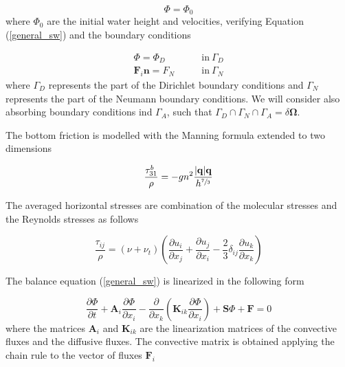 \documentclass[a4paper,12pt]{article}
\newcommand{\pder}[2]{\frac{\partial#1}{\partial#2}}
\newcommand{\abs}[1]{\lvert#1\rvert}
\begin{document}
\begin{equation}
\Phi = \Phi_0
\end{equation}
where $\Phi_0$ are the initial water height and velocities, verifying Equation (\ref{general_sw}) and the boundary conditions

\begin{align}
\Phi = \Phi_D \qquad &\text{in} \ \Gamma_D \\
\mathbf{F}_i\mathbf{n} = F_N \qquad &\text{in} \ \Gamma_N
\end{align}
where $\Gamma_D$ represents the part of the Dirichlet boundary conditions and $\Gamma_N$ represents the part of the Neumann boundary conditions. We will consider also absorbing boundary conditions ind $\Gamma_A$, such that $\Gamma_D \cap \Gamma_N \cap \Gamma_A = \delta\bm{\Omega}$.

The bottom friction is modelled with the Manning formula extended to two dimensions

\begin{equation}
\frac{\tau^b_{31}}{\rho} = -gn^2\frac{\abs{\mathbf{q}}\mathbf{q}}{h^{\sfrac{7}{3}}}
\end{equation}

The averaged horizontal stresses are combination of the molecular stresses and the Reynolds stresses as follows

\begin{equation} \label{stresses}
\frac{\tau_{ij}}{\rho} = (\nu + \nu_t)\left(
    \pder{u_i}{x_j} + \pder{u_j}{x_i} -\frac{2}{3}\delta_{ij}\pder{u_k}{x_k} \right)
\end{equation}

The balance equation (\ref{general_sw}) is linearized in the following form

\begin{equation}
\pder{\Phi}{t} + \mathbf{A}_i\pder{\Phi}{x_i}
 - \pder{}{x_k}\left(\mathbf{K}_{ik}\pder{\Phi}{x_i}\right) + \mathbf{S}\Phi + \mathbf{F} = 0
\end{equation}
where the matrices $\mathbf{A}_i$ and $\mathbf{K}_{ik}$ are the linearization matrices of the convective fluxes and the diffusive fluxes. The convective matrix is obtained applying the chain rule to the vector of fluxes $\mathbf{F}_i$
\end{document}
